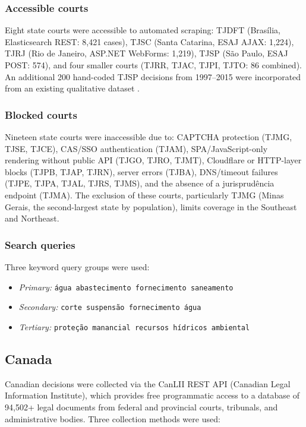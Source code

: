 \documentclass[12pt]{article}
\begin{document}
\subsubsection{Accessible courts}

Eight state courts were accessible to automated scraping: TJDFT (Brasília, Elasticsearch REST: 8,421 cases), TJSC (Santa Catarina, ESAJ AJAX: 1,224), TJRJ (Rio de Janeiro, ASP.NET WebForms: 1,219), TJSP (São Paulo, ESAJ POST: 574), and four smaller courts (TJRR, TJAC, TJPI, TJTO: 86 combined). An additional 200 hand-coded TJSP decisions from 1997--2015 were incorporated from an existing qualitative dataset \citep{haglund2019}.

\subsubsection{Blocked courts}

Nineteen state courts were inaccessible due to: CAPTCHA protection (TJMG, TJSE, TJCE), CAS/SSO authentication (TJAM), SPA/JavaScript-only rendering without public API (TJGO, TJRO, TJMT), Cloudflare or HTTP-layer blocks (TJPB, TJAP, TJRN), server errors (TJBA), DNS/timeout failures (TJPE, TJPA, TJAL, TJRS, TJMS), and the absence of a jurisprudência endpoint (TJMA). The exclusion of these courts, particularly TJMG (Minas Gerais, the second-largest state by population), limits coverage in the Southeast and Northeast.

\subsubsection{Search queries}

Three keyword query groups were used:
\begin{itemize}[noitemsep]
  \item \emph{Primary:} \texttt{água abastecimento fornecimento saneamento}
  \item \emph{Secondary:} \texttt{corte suspensão fornecimento água}
  \item \emph{Tertiary:} \texttt{proteção manancial recursos hídricos ambiental}
\end{itemize}

\subsection{Canada}

Canadian decisions were collected via the CanLII REST API (Canadian Legal Information Institute), which provides free programmatic access to a database of 94,502+ legal documents from federal and provincial courts, tribunals, and administrative bodies. Three collection methods were used:
\end{document}
